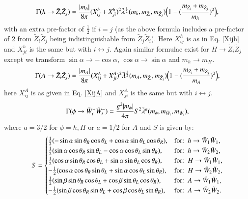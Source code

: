 \documentclass[final,3p,times,pdflatex]{elsarticle}
\begin{document}
\begin{equation}\label{hneutneut}
\Gamma (h \rightarrow \tilde{Z}_i \tilde{Z}_j) = {|m_h| \over 8\pi} (X_{ij}^{h} + X_{ji}^{h})^2 \tilde{\lambda}^{1 \over 2} (m_h,m_{\tilde{Z}_i}, m_{\tilde{Z}_j}) \Big(1 - ({m_{\tilde{Z}_i} + m_{\tilde{Z}_j} \over m_h})^2\Big),
\end{equation} 
with an extra pre-factor of $\frac{1}{2}$ if $i=j$ (as the above formula
includes a pre-factor of 2 from $\tilde{Z}_i \tilde{Z}_j$ being
indistinguishable from $\tilde{Z}_j \tilde{Z}_i$). 
Here $X_{ij}^{h}$ is as in Eq. \eqref{Xijh} and $X_{ji}^{h}$ is the same but with $i \leftrightarrow j$.
Again similar formulae exist for $H \rightarrow \tilde{Z}_i \tilde{Z}_j$ except we transform $\sin\alpha \rightarrow -\cos\alpha$,  $\cos\alpha \rightarrow \sin\alpha$ and $m_h \rightarrow m_H$.
\begin{equation}\label{Aneutneut}
\Gamma (A \rightarrow \tilde{Z}_i \tilde{Z}_j) = {|m_A| \over 8\pi} (X_{ij}^{A} + X_{ji}^{A})^2 \tilde{\lambda}^{1 \over 2} (m_A,m_{\tilde{Z}_i}, m_{\tilde{Z}_j}) \Big(1 - ({m_{\tilde{Z}_i} + m_{\tilde{Z}_j} \over m_A})^2\Big),
\end{equation} 
here $X_{ij}^{A}$ is as given in Eq. \eqref{XijA} and $X_{ji}^{A}$ is the same but with $i \leftrightarrow j$.
\begin{equation}\label{phichch}
\Gamma (\phi \rightarrow \tilde{W}_i^+ \tilde{W}_i^-) = {g^2 |m_\phi| \over 4\pi} S^2  \tilde{\lambda}^{a} (m_\phi,m_{\tilde{W}_i}, m_{\tilde{W}_i}) ,
\end{equation} 
where $a=3/2$ for $\phi= h, H$ or $a=1/2$ for $A$ and $S$ is given by:
\begin{equation}
S = \begin{cases}
  	{1 \over 2} (-\sin \alpha \sin \theta_R \cos \theta_L + \cos \alpha \sin \theta_L \cos \theta_R), & $for$ :\ h \rightarrow \tilde{W}_1 \tilde{W}_1, \\
  	{1 \over 2} (\sin \alpha \cos \theta_R \sin \theta_L - \cos \alpha \cos \theta_L \sin \theta_R), & $for$ :\ h \rightarrow \tilde{W}_2 \tilde{W}_2, \\
  	{1 \over 2} (\cos \alpha \sin \theta_R \cos \theta_L + \sin \alpha \sin \theta_L \cos \theta_R), & $for$ :\ H \rightarrow \tilde{W}_1 \tilde{W}_1, \\
  	-{1 \over 2} (\cos \alpha \cos \theta_R \sin \theta_L + \sin \alpha \cos \theta_L \sin \theta_R), & $for$ :\ H \rightarrow \tilde{W}_2 \tilde{W}_2, \\
  	{1 \over 2} (\sin \beta \sin \theta_R \cos \theta_L + \cos \beta \sin \theta_L \cos \theta_R), & $for$ :\ A \rightarrow \tilde{W}_1 \tilde{W}_1, \\
  	-{1 \over 2} (\sin \beta \cos \theta_R \sin \theta_L + \cos \beta \cos \theta_L \sin \theta_R), & $for$ :\ A \rightarrow \tilde{W}_2 \tilde{W}_2. \\
  \end{cases}
\end{equation}
\end{document}
